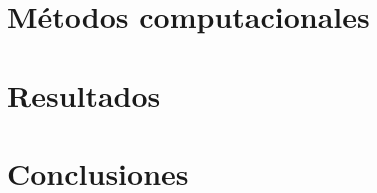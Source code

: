 \documentclass[a4paper,openany,12pt]{report}
\begin{document}
    
    \chapter{M\'etodos computacionales}
    
	
	
	\chapter{Resultados}
	
    
    
    \chapter*{Conclusiones}
    
    
     
     \appendix
     
	
	
	
	
\end{document}
